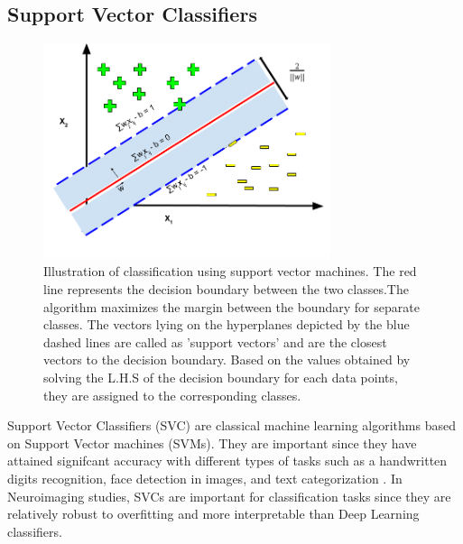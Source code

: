 \documentclass[msthesis.tex]{subfiles}
\begin{document}
\subsection{Support Vector Classifiers}
\begin{figure}
    \label{fig:svm}
    \centering
    \includegraphics[width=0.75\textwidth]{images/SVM.png}
    \caption{Illustration of classification using support vector machines. The red line represents the decision boundary between the two classes.The algorithm maximizes the margin between the boundary for separate classes. The vectors lying on the hyperplanes depicted by the blue dashed lines are called as 'support vectors' and are the closest vectors to the decision boundary. Based on the values obtained by solving the L.H.S of the decision boundary for each data points, they are assigned to the corresponding classes.}
\end{figure}

Support Vector Classifiers (SVC) are classical machine learning algorithms based on Support Vector machines (SVMs). They are important since they have attained signifcant accuracy with different types of tasks such as a handwritten digits recognition, face detection in images, and text categorization \cite{burges1998a}. In Neuroimaging studies, SVCs are important for classification tasks since they are relatively robust to overfitting and more interpretable than Deep Learning classifiers.
\end{document}
